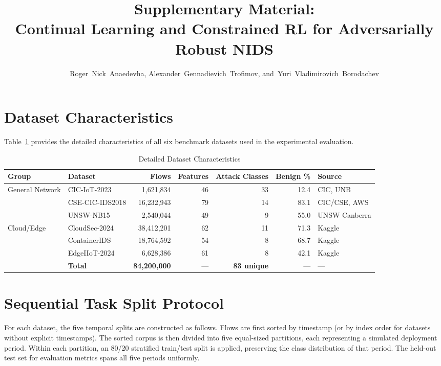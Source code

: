 \documentclass[journal]{IEEEtran}
\begin{document}
\title{Supplementary Material:\\Continual Learning and Constrained RL for Adversarially Robust NIDS}

\author{Roger~Nick~Anaedevha, Alexander~Gennadievich~Trofimov,
        and~Yuri~Vladimirovich~Borodachev}

\maketitle

\section{Dataset Characteristics}

Table~\ref{tab:datasets} provides the detailed characteristics of all six benchmark datasets used in the experimental evaluation.

\begin{table}[!t]
\centering
\caption{Detailed Dataset Characteristics}
\label{tab:datasets}
\begin{tabular}{@{}llrrrrl@{}}
\toprule
\textbf{Group} & \textbf{Dataset} & \textbf{Flows} & \textbf{Features} & \textbf{Attack Classes} & \textbf{Benign \%} & \textbf{Source} \\
\midrule
\multirow{3}{*}{General Network} & CIC-IoT-2023 & 1{,}621{,}834 & 46 & 33 & 12.4 & CIC, UNB \\
& CSE-CIC-IDS2018 & 16{,}232{,}943 & 79 & 14 & 83.1 & CIC/CSE, AWS \\
& UNSW-NB15 & 2{,}540{,}044 & 49 & 9 & 55.0 & UNSW Canberra \\
\midrule
\multirow{3}{*}{Cloud/Edge} & CloudSec-2024 & 38{,}412{,}201 & 62 & 11 & 71.3 & Kaggle \\
& ContainerIDS & 18{,}764{,}592 & 54 & 8 & 68.7 & Kaggle \\
& EdgeIIoT-2024 & 6{,}628{,}386 & 61 & 8 & 42.1 & Kaggle \\
\midrule
& \textbf{Total} & \textbf{84{,}200{,}000} & --- & \textbf{83 unique} & --- & --- \\
\bottomrule
\end{tabular}
\end{table}

\section{Sequential Task Split Protocol}

For each dataset, the five temporal splits are constructed as follows. Flows are first sorted by timestamp (or by index order for datasets without explicit timestamps). The sorted corpus is then divided into five equal-sized partitions, each representing a simulated deployment period. Within each partition, an 80/20 stratified train/test split is applied, preserving the class distribution of that period. The held-out test set for evaluation metrics spans all five periods uniformly.
\end{document}

